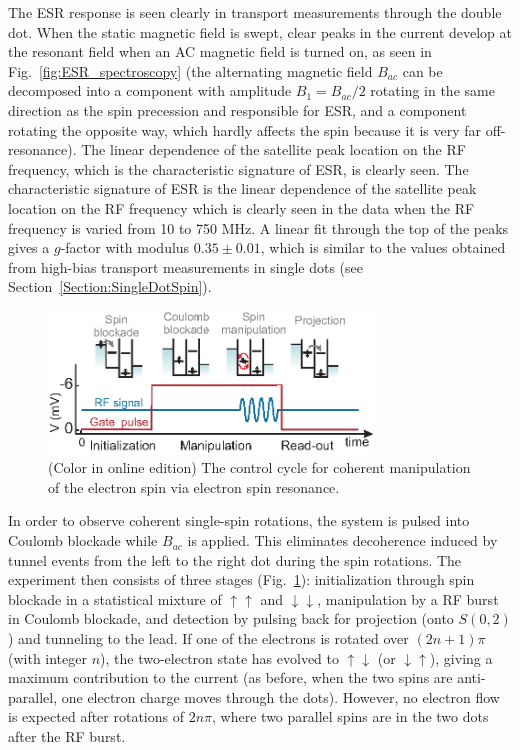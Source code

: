 \documentclass[rmp,twocolumn,aps]{revtex4}
\begin{document}
The ESR response is seen clearly in transport measurements through
the double dot. When the static magnetic field is swept, clear
peaks in the current develop at the resonant field when an AC
magnetic field is turned on, as seen in
Fig.~\ref{fig:ESR_spectroscopy} (the alternating magnetic field
$B_{ac}$ can be decomposed into a component with amplitude
$B_1=B_{ac}/2$ rotating in the same direction as the spin
precession and responsible for ESR, and a component rotating the
opposite way, which hardly affects the spin because it is very far
off-resonance). The linear dependence of the satellite peak location on the RF frequency,
which is the characteristic signature of ESR, is clearly seen.
The characteristic signature of ESR is the linear dependence
of the satellite peak location on the RF frequency which is
clearly seen in the data when the RF frequency is varied from 10
to 750 MHz. A linear fit through the top of the peaks gives a
$g$-factor with modulus $0.35\pm0.01$, which is similar to the
values obtained from high-bias transport measurements in single
dots (see Section~\ref{Section:SingleDotSpin}).

\begin{figure}[htb]
\includegraphics[width=3.4in]{hanson_fig44.eps}
\caption{(Color in online edition) The control cycle for coherent manipulation of the
electron spin via electron spin resonance.}
\label{fig:ESR_Rabi_concept}
\end{figure}

In order to observe coherent single-spin rotations, the system is
pulsed into Coulomb blockade while $B_{ac}$ is applied. This
eliminates decoherence induced by tunnel events from the left to
the right dot during the spin rotations. The experiment then
consists of three stages (Fig.~\ref{fig:ESR_Rabi_concept}):
initialization through spin blockade in a statistical mixture of
$\uparrow\uparrow$ and $\downarrow\downarrow$, manipulation by a
RF burst in Coulomb blockade, and detection by pulsing back for
projection (onto $S(0,2)$) and tunneling to the lead. If one of
the electrons is rotated over $(2n+1)\pi$ (with integer $n$), the
two-electron state has evolved to $\uparrow\downarrow$ (or
$\downarrow\uparrow$), giving a maximum contribution to the
current (as before, when the two spins are anti-parallel, one
electron charge moves through the dots). However, no electron flow
is expected after rotations of $2n \pi$, where two parallel spins
are in the two dots after the RF burst.
\end{document}
